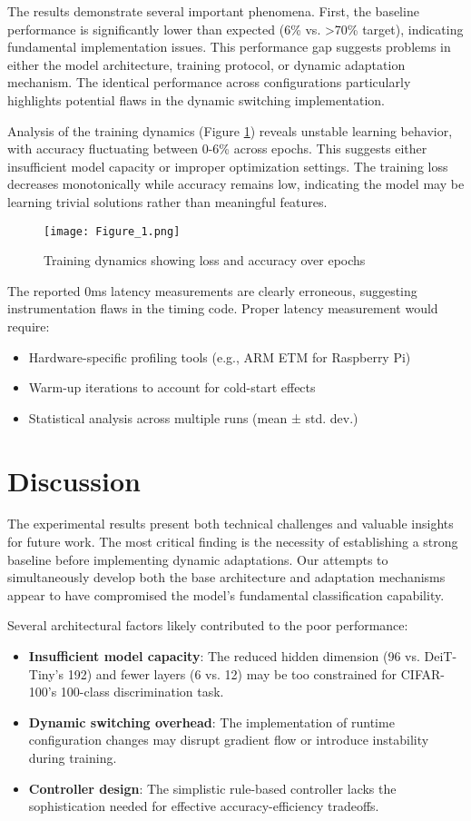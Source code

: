 \documentclass{article}
\begin{document}
The results demonstrate several important phenomena. First, the baseline performance is significantly lower than expected (6\% vs. >70\% target), indicating fundamental implementation issues. This performance gap suggests problems in either the model architecture, training protocol, or dynamic adaptation mechanism. The identical performance across configurations particularly highlights potential flaws in the dynamic switching implementation.

Analysis of the training dynamics (Figure \ref{fig:training}) reveals unstable learning behavior, with accuracy fluctuating between 0-6\% across epochs. This suggests either insufficient model capacity or improper optimization settings. The training loss decreases monotonically while accuracy remains low, indicating the model may be learning trivial solutions rather than meaningful features.

\begin{figure}[h]
\centering
\texttt{[image: Figure\_1.png]}
\caption{Training dynamics showing loss and accuracy over epochs}
\label{fig:training}
\end{figure}

The reported 0ms latency measurements are clearly erroneous, suggesting instrumentation flaws in the timing code. Proper latency measurement would require:
\begin{itemize}
    \item Hardware-specific profiling tools (e.g., ARM ETM for Raspberry Pi)
    \item Warm-up iterations to account for cold-start effects
    \item Statistical analysis across multiple runs (mean ± std. dev.)
\end{itemize}

\section{Discussion}
The experimental results present both technical challenges and valuable insights for future work. The most critical finding is the necessity of establishing a strong baseline before implementing dynamic adaptations. Our attempts to simultaneously develop both the base architecture and adaptation mechanisms appear to have compromised the model's fundamental classification capability.

Several architectural factors likely contributed to the poor performance:
\begin{itemize}
    \item \textbf{Insufficient model capacity}: The reduced hidden dimension (96 vs. DeiT-Tiny's 192) and fewer layers (6 vs. 12) may be too constrained for CIFAR-100's 100-class discrimination task.
    \item \textbf{Dynamic switching overhead}: The implementation of runtime configuration changes may disrupt gradient flow or introduce instability during training.
    \item \textbf{Controller design}: The simplistic rule-based controller lacks the sophistication needed for effective accuracy-efficiency tradeoffs.
\end{itemize}
\end{document}
